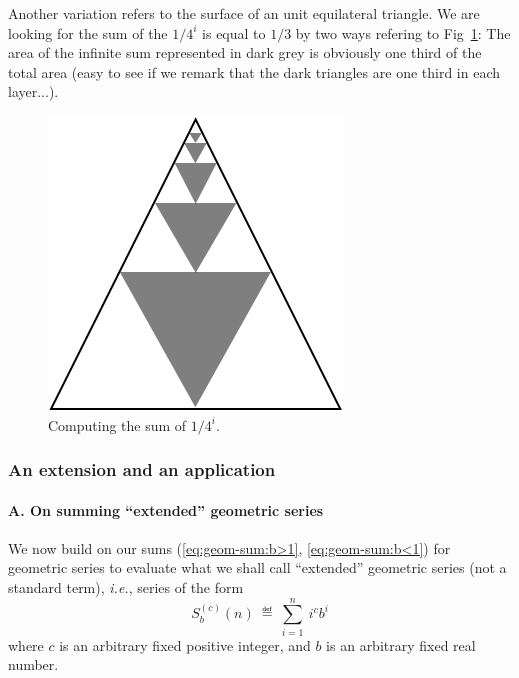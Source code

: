 Another variation refers to the surface of an unit equilateral triangle. 
We are looking for the sum of the $1/4^i$ is equal to $1/3$ by two ways
refering to Fig~\ref{fig:sumGeo1sur4}: The area of the infinite sum represented in dark grey is obviously one third of the total area
(easy to see if we remark that the dark triangles are one third in each layer...). 
\begin{figure}[ht]
\begin{center}
       \includegraphics[scale=0.4]{FiguresMaths/SumGeometric1sur4}
\caption{Computing the sum of $1/4^i$.}
       \label{fig:sumGeo1sur4}
\end{center}
\end{figure}

\subsubsection{An extension and an application}
\label{sec:extended-geom-series}

\paragraph{\sf A. On summing ``extended'' geometric series}
We now build on our sums (\ref{eq:geom-sum:b>1},
\ref{eq:geom-sum:b<1}) for geometric series to evaluate what we shall
call ``extended'' geometric series (not a standard term), \textit{i.e.}, series
of the form
\[ S_b^{(c)}(n) \ \eqdef \ \sum_{i=1}^n \ i^c b^i \]
where $c$ is an arbitrary fixed positive integer, and $b$ is an
arbitrary fixed real number.

